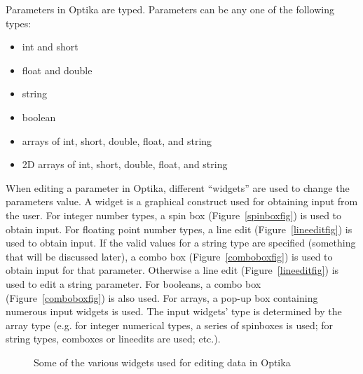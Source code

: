 Parameters in Optika are typed. Parameters can be any one of the following types:
	\begin{itemize}
		\item int and short
		\item float and double
		\item string
		\item boolean
		\item arrays of int, short, double, float, and string
		\item 2D arrays of int, short, double, float, and string
	\end{itemize}
When editing a parameter in Optika, different ``widgets'' are used to change the parameters value. A widget is 
a graphical construct used for obtaining input from the user. For integer number types, a spin box (Figure~\ref{spinboxfig}) is used to obtain input. 
For floating point number types, a line edit (Figure~\ref{lineeditfig}) is used to obtain input.
If the valid values for a string type are specified (something that will be discussed later), a combo box (Figure~\ref{comboboxfig}) is used to obtain
input for that parameter.
Otherwise a line edit (Figure~\ref{lineeditfig}) is used to edit a string parameter. For booleans, a combo box (Figure~\ref{comboboxfig}) 
is also used. For arrays, a pop-up box containing numerous input widgets is used. The input widgets' type is determined by the
array type (e.g. for integer numerical types, a series of spinboxes is used; for string types, comboxes or lineedits are used; etc.). 

\begin{figure}
	\centering
	\caption{Some of the various widgets used for editing data in Optika~\cite{QtGallery}}
	\label{editingWidgets}
\end{figure}

